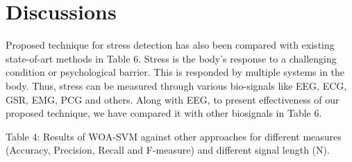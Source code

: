 \section{Discussions}

Proposed technique for stress detection has also been compared with existing state-of-art methods in Table 6. Stress is the body’s response to a challenging condition or psychological barrier. This is responded by multiple systems in the body. Thus, stress can be measured through various bio-signals like EEG, ECG, GSR, EMG, PCG and others. Along with EEG, to present effectiveness of our proposed technique, we have compared it with other biosignals in Table 6.

Table 4: Results of WOA-SVM against other approaches for different measures (Accuracy, Precision, Recall and F-measure) and different signal length (N).


